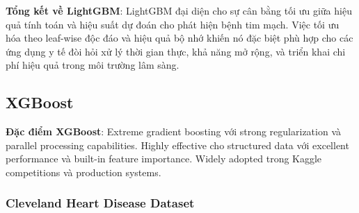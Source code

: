 \textbf{Tổng kết về LightGBM}: LightGBM đại diện cho sự cân bằng tối ưu giữa hiệu quả tính toán và hiệu suất dự đoán cho phát hiện bệnh tim mạch. Việc tối ưu hóa theo leaf-wise độc đáo và hiệu quả bộ nhớ khiến nó đặc biệt phù hợp cho các ứng dụng y tế đòi hỏi xử lý thời gian thực, khả năng mở rộng, và triển khai chi phí hiệu quả trong môi trường lâm sàng.

\FloatBarrier

\subsection{XGBoost}\label{subsec:xgboost}

\textbf{Đặc điểm XGBoost}: Extreme gradient boosting với strong regularization và parallel processing capabilities. Highly effective cho structured data với excellent performance và built-in feature importance. Widely adopted trong Kaggle competitions và production systems.

\subsubsection{Cleveland Heart Disease Dataset}\label{subsubsec:xgb-cleveland}

